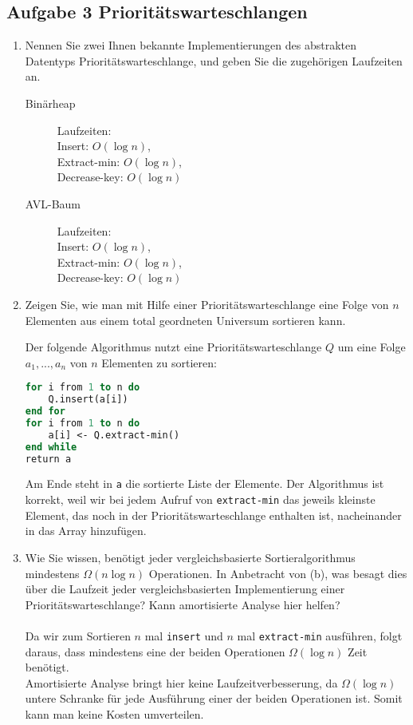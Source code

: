 \documentclass[11pt,a4paper,ngerman]{article}
\begin{document}
\pagebreak

\subsection*{Aufgabe 3 \mdseries Prioritätswarteschlangen}

\begin{enumerate}[\bfseries a)]

\item Nennen Sie zwei Ihnen bekannte Implementierungen des abstrakten Datentyps Prioritätswarteschlange, und geben Sie die zugehörigen Laufzeiten an.

\begin{description}
\item[Binärheap] Laufzeiten: \\
Insert: $O(\log n)$, \\
Extract-min: $O(\log n)$, \\
Decrease-key: $O(\log n)$
\item[AVL-Baum] Laufzeiten: \\
Insert: $O(\log n)$, \\
Extract-min: $O(\log n)$, \\
Decrease-key: $O(\log n)$
\end{description}


\item Zeigen Sie, wie man mit Hilfe einer Prioritätswarteschlange eine Folge von $n$ Elementen aus einem total geordneten Universum sortieren kann.

Der folgende Algorithmus nutzt eine Prioritätswarteschlange $Q$ um eine Folge $a_1, ..., a_n$ von $n$ Elementen zu sortieren:

\begin{lstlisting}[language=Pascal]
for i from 1 to n do
	Q.insert(a[i])
end for
for i from 1 to n do
	a[i] <- Q.extract-min()
end while
return a
\end{lstlisting}

Am Ende steht in \texttt{a} die sortierte Liste der Elemente. Der Algorithmus ist korrekt, weil wir bei jedem Aufruf von \texttt{extract-min} das jeweils kleinste Element, das noch in der Prioritätswarteschlange enthalten ist, nacheinander in das Array hinzufügen.

\item Wie Sie wissen, benötigt jeder vergleichsbasierte Sortieralgorithmus mindestens $\Omega(n \log n)$ Operationen. In Anbetracht von (b), was besagt dies über die Laufzeit jeder vergleichsbasierten Implementierung einer Prioritätswarteschlange?
Kann amortisierte Analyse hier helfen?
\\ \\
Da wir zum Sortieren $n$ mal \texttt{insert} und $n$ mal \texttt{extract-min} ausführen, folgt daraus, dass mindestens eine der beiden Operationen $\Omega(\log n)$ Zeit benötigt.\\
Amortisierte Analyse bringt hier keine Laufzeitverbesserung, da $\Omega(\log n)$ untere Schranke für jede Ausführung einer der beiden Operationen ist. Somit kann man keine Kosten umverteilen.
\end{enumerate}

\label{LastPage}
\end{document}
